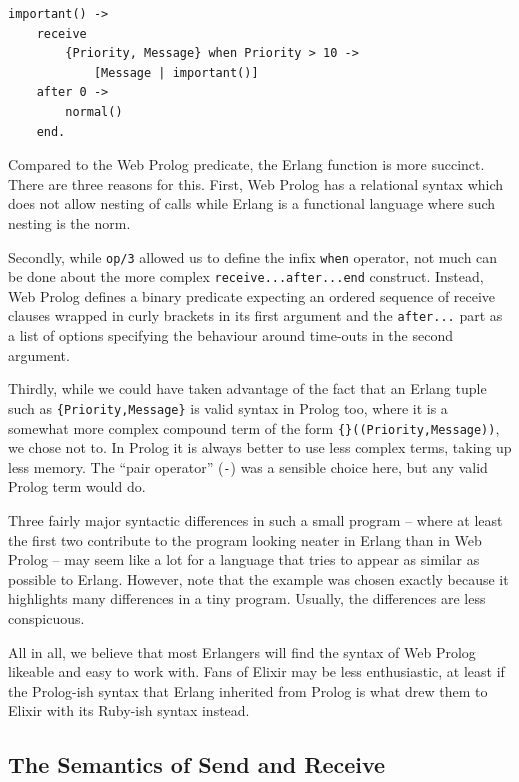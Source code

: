 \documentclass{tlp}
\begin{document}
\begin{lstlisting}
important() ->
    receive
        {Priority, Message} when Priority > 10 ->
            [Message | important()]
    after 0 ->
        normal()
    end.
\end{lstlisting}

\noindent Compared to the Web Prolog predicate, the Erlang function is more succinct. There are three reasons for this. First, Web Prolog has a relational syntax which does not allow nesting of calls while Erlang is a functional language where such nesting is the norm. 

Secondly, while \texttt{op/3} allowed us to define the infix \texttt{when} operator, not much can be done about the more complex \texttt{receive...after...end} construct. Instead, Web Prolog defines a binary predicate expecting an ordered sequence of receive clauses wrapped in curly brackets in its first argument and the \texttt{after...} part as a list of options specifying the behaviour around time-outs in the second argument.

Thirdly, while we could have taken advantage of the fact that an Erlang tuple such as \texttt{\{Priority,Message\}} is valid syntax in Prolog too, where it is a somewhat more complex compound term of the form \texttt{\{\}((Priority,Message))}, we chose not to. In Prolog it is always better to use less complex terms, taking up less memory. The ``pair operator'' (\texttt{-}) was a sensible choice here, but any valid Prolog term would do. %

Three fairly major syntactic differences in such a small program -- where at least the first two contribute to the program looking neater in Erlang than in Web Prolog -- may seem like a lot for a language that tries to appear as similar as possible to Erlang. However, note that the example was chosen exactly because it highlights many differences in a tiny program. Usually, the differences are less conspicuous.

All in all, we believe that most Erlangers will find the syntax of Web Prolog likeable and easy to work with. Fans of Elixir may be less enthusiastic, at least if the Prolog-ish syntax that Erlang inherited from Prolog is what drew them to Elixir with its Ruby-ish syntax instead. %


\subsection{The Semantics of Send and Receive}
\end{document}
